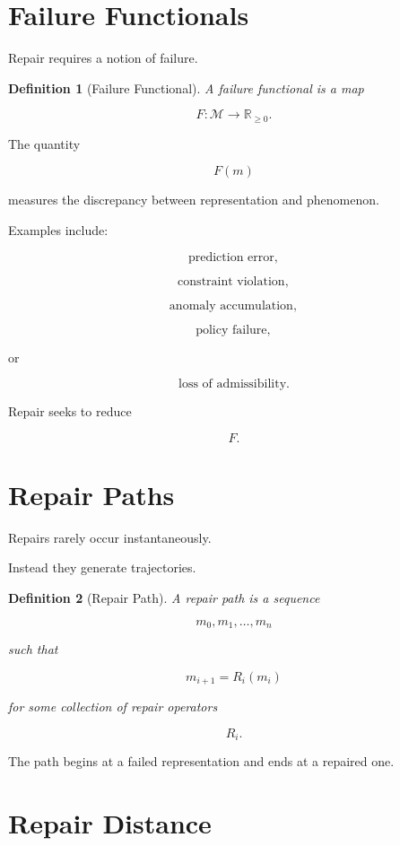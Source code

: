 \documentclass[11pt,oneside,openany]{book}
\newtheorem{definition}{Definition}[chapter] \newtheorem{theorem}{Theorem}[chapter] \newtheorem{proposition}{Proposition}[chapter] \newtheorem{lemma}{Lemma}[chapter] \newtheorem{corollary}{Corollary}[chapter] \newtheorem{remark}{Remark}[chapter]
\begin{document}
\section{Failure Functionals}

Repair requires a notion of failure.

\begin{definition}[Failure Functional]

A failure functional is a map

\[
F:\mathcal M\rightarrow\mathbb R_{\ge0}.
\]

\end{definition}

The quantity

\[
F(m)
\]

measures the discrepancy between representation and phenomenon.

Examples include:

\[
\text{prediction error},
\]

\[
\text{constraint violation},
\]

\[
\text{anomaly accumulation},
\]

\[
\text{policy failure},
\]

or

\[
\text{loss of admissibility}.
\]

Repair seeks to reduce

\[
F.
\]

\section{Repair Paths}

Repairs rarely occur instantaneously.

Instead they generate trajectories.

\begin{definition}[Repair Path]

A repair path is a sequence

\[
m_0,m_1,\ldots,m_n
\]

such that

\[
m_{i+1}=R_i(m_i)
\]

for some collection of repair operators

\[
R_i.
\]

\end{definition}

The path begins at a failed representation and ends at a repaired one.

\section{Repair Distance}
\end{document}
